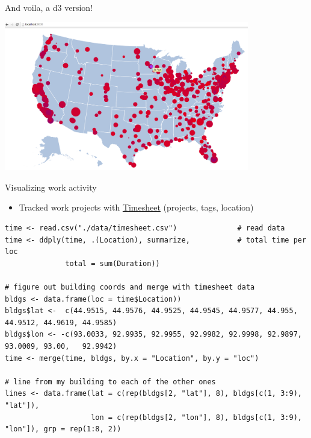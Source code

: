 \documentclass[sans,aspectratio=169,presentation,bigger,fleqn]{beamer}
\begin{document}
\begin{frame}[label=sec-31]{And voila, a d3 version!}
\begin{center}
\includegraphics[height=6.5cm]{./img/transpo-d3.png}
\end{center}
\end{frame}
\begin{frame}[fragile,label=sec-32]{Visualizing work activity}
 \begin{itemize}
\item Tracked work projects with \href{https://play.google.com/store/apps/details?id=com.rauscha.apps.timesheet}{Timesheet} (projects, tags, location)
\end{itemize}

\scriptsize
\begin{verbatim}
time <- read.csv("./data/timesheet.csv")              # read data
time <- ddply(time, .(Location), summarize,           # total time per loc
              total = sum(Duration)) 

# figure out building coords and merge with timesheet data
bldgs <- data.frame(loc = time$Location))
bldgs$lat <-  c(44.9515, 44.9576, 44.9525, 44.9545, 44.9577, 44.955,  44.9512, 44.9619, 44.9585)
bldgs$lon <- -c(93.0033, 92.9935, 92.9955, 92.9982, 92.9998, 92.9897, 93.0009, 93.00,   92.9942)
time <- merge(time, bldgs, by.x = "Location", by.y = "loc")

# line from my building to each of the other ones
lines <- data.frame(lat = c(rep(bldgs[2, "lat"], 8), bldgs[c(1, 3:9), "lat"]),
                    lon = c(rep(bldgs[2, "lon"], 8), bldgs[c(1, 3:9), "lon"]), grp = rep(1:8, 2))
\end{verbatim}
\normalsize


\scriptsize
\normalsize
\end{frame}
\end{document}
